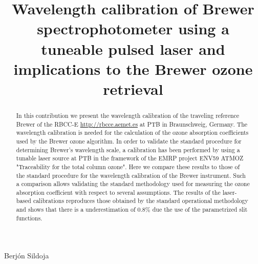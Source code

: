 \documentclass[acp, manuscript]{copernicus}
\begin{document}
\title{Wavelength calibration of Brewer spectrophotometer using a tuneable pulsed laser and implications to the Brewer ozone retrieval}


 {Berjón}
 {Sildoja}












\received{}
\pubdiscuss{} %
\revised{}
\accepted{}
\published{}




\maketitle



\begin{abstract}

In this contribution we present the wavelength calibration of the traveling reference Brewer of the RBCC-E  \url{http://rbcce.aemet.es}  at PTB in Braunschweig, Germany. The wavelength calibration is needed for the calculation of the ozone absorption coefficients used by the Brewer ozone algorithm. In order to validate the standard procedure for determining Brewer’s wavelength scale, a calibration has been performed by using a tunable laser source at PTB in the framework of the EMRP project ENV59 ATMOZ "Traceability for the total column ozone". Here we compare these results to those of the standard procedure for the wavelength calibration of the Brewer instrument. Such a comparison allows validating the standard methodology used for measuring the ozone absorption coefficient with respect to several assumptions. The results of the laser-based calibrations reproduces those obtained by the standard operational methodology and shows that there is a underestimation of 0.8\%  due the use of the parametrized slit functions. 
\end{abstract}
\end{document}
